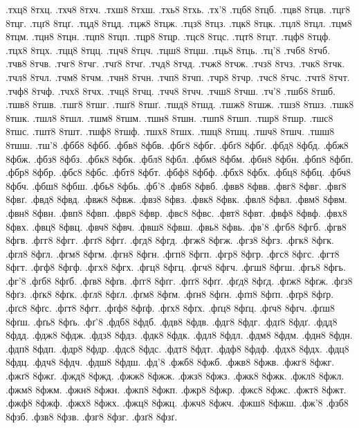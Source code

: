 {.тхц8
8тхц.
.тхч8
8тхч.
.тхш8
8тхш.
.тхь8
8тхь.
.тх'8
.тцб8
8тцб.
.тцв8
8тцв.
.тцг8
8тцг.
.тцґ8
8тцґ.
.тцд8
8тцд.
.тцж8
8тцж.
.тцз8
8тцз.
.тцк8
8тцк.
.тцл8
8тцл.
.тцм8
8тцм.
.тцн8
8тцн.
.тцп8
8тцп.
.тцр8
8тцр.
.тцс8
8тцс.
.тцт8
8тцт.
.тцф8
8тцф.
.тцх8
8тцх.
.тцц8
8тцц.
.тцч8
8тцч.
.тцш8
8тцш.
.тць8
8тць.
.тц'8
.тчб8
8тчб.
.тчв8
8тчв.
.тчг8
8тчг.
.тчґ8
8тчґ.
.тчд8
8тчд.
.тчж8
8тчж.
.тчз8
8тчз.
.тчк8
8тчк.
.тчл8
8тчл.
.тчм8
8тчм.
.тчн8
8тчн.
.тчп8
8тчп.
.тчр8
8тчр.
.тчс8
8тчс.
.тчт8
8тчт.
.тчф8
8тчф.
.тчх8
8тчх.
.тчц8
8тчц.
.тчч8
8тчч.
.тчш8
8тчш.
.тч'8
.тшб8
8тшб.
.тшв8
8тшв.
.тшг8
8тшг.
.тшґ8
8тшґ.
.тшд8
8тшд.
.тшж8
8тшж.
.тшз8
8тшз.
.тшк8
8тшк.
.тшл8
8тшл.
.тшм8
8тшм.
.тшн8
8тшн.
.тшп8
8тшп.
.тшр8
8тшр.
.тшс8
8тшс.
.тшт8
8тшт.
.тшф8
8тшф.
.тшх8
8тшх.
.тшц8
8тшц.
.тшч8
8тшч.
.тшш8
8тшш.
.тш'8
.фбб8
8фбб.
.фбв8
8фбв.
.фбг8
8фбг.
.фбґ8
8фбґ.
.фбд8
8фбд.
.фбж8
8фбж.
.фбз8
8фбз.
.фбк8
8фбк.
.фбл8
8фбл.
.фбм8
8фбм.
.фбн8
8фбн.
.фбп8
8фбп.
.фбр8
8фбр.
.фбс8
8фбс.
.фбт8
8фбт.
.фбф8
8фбф.
.фбх8
8фбх.
.фбц8
8фбц.
.фбч8
8фбч.
.фбш8
8фбш.
.фбь8
8фбь.
.фб'8
.фвб8
8фвб.
.фвв8
8фвв.
.фвг8
8фвг.
.фвґ8
8фвґ.
.фвд8
8фвд.
.фвж8
8фвж.
.фвз8
8фвз.
.фвк8
8фвк.
.фвл8
8фвл.
.фвм8
8фвм.
.фвн8
8фвн.
.фвп8
8фвп.
.фвр8
8фвр.
.фвс8
8фвс.
.фвт8
8фвт.
.фвф8
8фвф.
.фвх8
8фвх.
.фвц8
8фвц.
.фвч8
8фвч.
.фвш8
8фвш.
.фвь8
8фвь.
.фв'8
.фгб8
8фгб.
.фгв8
8фгв.
.фгг8
8фгг.
.фгґ8
8фгґ.
.фгд8
8фгд.
.фгж8
8фгж.
.фгз8
8фгз.
.фгк8
8фгк.
.фгл8
8фгл.
.фгм8
8фгм.
.фгн8
8фгн.
.фгп8
8фгп.
.фгр8
8фгр.
.фгс8
8фгс.
.фгт8
8фгт.
.фгф8
8фгф.
.фгх8
8фгх.
.фгц8
8фгц.
.фгч8
8фгч.
.фгш8
8фгш.
.фгь8
8фгь.
.фг'8
.фґб8
8фґб.
.фґв8
8фґв.
.фґг8
8фґг.
.фґґ8
8фґґ.
.фґд8
8фґд.
.фґж8
8фґж.
.фґз8
8фґз.
.фґк8
8фґк.
.фґл8
8фґл.
.фґм8
8фґм.
.фґн8
8фґн.
.фґп8
8фґп.
.фґр8
8фґр.
.фґс8
8фґс.
.фґт8
8фґт.
.фґф8
8фґф.
.фґх8
8фґх.
.фґц8
8фґц.
.фґч8
8фґч.
.фґш8
8фґш.
.фґь8
8фґь.
.фґ'8
.фдб8
8фдб.
.фдв8
8фдв.
.фдг8
8фдг.
.фдґ8
8фдґ.
.фдд8
8фдд.
.фдж8
8фдж.
.фдз8
8фдз.
.фдк8
8фдк.
.фдл8
8фдл.
.фдм8
8фдм.
.фдн8
8фдн.
.фдп8
8фдп.
.фдр8
8фдр.
.фдс8
8фдс.
.фдт8
8фдт.
.фдф8
8фдф.
.фдх8
8фдх.
.фдц8
8фдц.
.фдч8
8фдч.
.фдш8
8фдш.
.фд'8
.фжб8
8фжб.
.фжв8
8фжв.
.фжг8
8фжг.
.фжґ8
8фжґ.
.фжд8
8фжд.
.фжж8
8фжж.
.фжз8
8фжз.
.фжк8
8фжк.
.фжл8
8фжл.
.фжм8
8фжм.
.фжн8
8фжн.
.фжп8
8фжп.
.фжр8
8фжр.
.фжс8
8фжс.
.фжт8
8фжт.
.фжф8
8фжф.
.фжх8
8фжх.
.фжц8
8фжц.
.фжч8
8фжч.
.фжш8
8фжш.
.фж'8
.фзб8
8фзб.
.фзв8
8фзв.
.фзг8
8фзг.
.фзґ8
8фзґ.
}

